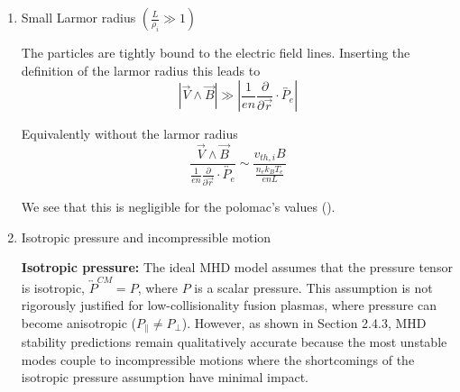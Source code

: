 \begin{enumerate}
\begin{enumerate}
The characteristic wave speed in MHD is the Alfvén velocity (\cite{Freidberg2014, Chen2016}):
\[
v_A = \frac{B}{\sqrt{\mu_0 \varrho}}
\]

We get for Polomac (\cite{Elio2024}):
\begin{itemize}
    \item Mass density: $ \varrho = n m_i = \SI{e20}{\per\meter\cubed} \times \SI{1.67e-27}{\kilo\gram} = \SI{1.67e-7}{\kilo\gram\per\meter\cubed}$
    \item Magnetic field: $B = \SI{0.25}{\tesla}$ (midpoint of \SIrange{0.2}{0.3}{\tesla} operating range)
    \item Alfvén velocity: $v_A = \frac{\SI{0.25}{\tesla}}{\sqrt{4\pi \times \SI{e-7}{\henry\per\meter} \times \SI{1.67e-7}{\kilo\gram\per\meter\cubed}}} = \SI{5.5e4}{\meter\per\second}$
    \item Speed of light: $c = \SI{3e8}{\meter\per\second}$
    \item $\frac{v_A}{c} = \frac{\SI{5.5e4}{\meter\per\second}}{\SI{3e8}{\meter\per\second}} \approx \num{1.8e-4} \ll 1$
\end{itemize}

Since MHD wave velocities are non-relativistic ($v_A \ll c$), we can safely neglect the displacement current $\epsilon_0 \partial \vec{E}/\partial t$ compared to $\vec{J}$ in Ampère's law.

Note that $\mu_0 \vec{J} = \nabla \wedge \vec{B}$ implies $\nabla \cdot \vec{J} = 0$.


\item Small Larmor radius $\left(\frac{L}{\rho_i} \gg 1\right)$

The particles are tightly bound to the electric field lines. Inserting the definition of the larmor radius this leads to
\[
\left|\vec{V} \wedge \vec{B}\right| \gg \left|\frac{1}{en} \frac{\partial}{\partial \vec{r}} \cdot \overleftrightarrow{P_e}\right|
\]

Equivalently without the larmor radius
\[
\frac{\vec{V}\wedge\vec{B}}{\frac{1}{en} \frac{\partial}{\partial \vec{r}} \cdot \overleftrightarrow{P_e}}
\sim \frac{v_{th, i} B}{\frac{n_e k_B T_e}{e n L}}
\]

We see that this is negligible for the polomac's values (\cite{Elio2024}).



\item Isotropic pressure and incompressible motion

    \textbf{Isotropic pressure:} The ideal MHD model assumes that the pressure tensor is isotropic, 
    $\overleftrightarrow{P}^{CM} = P$, where $P$ is a scalar pressure. This assumption 
    is not rigorously justified for low-collisionality fusion plasmas, where pressure can become 
    anisotropic ($P_\parallel \neq P_\perp$). However, as shown in \cite{Freidberg2014} Section 2.4.3, 
    MHD stability predictions remain qualitatively accurate because the most unstable modes couple 
    to incompressible motions where the shortcomings of the isotropic pressure assumption have 
    minimal impact.


\end{enumerate}
\end{enumerate}
